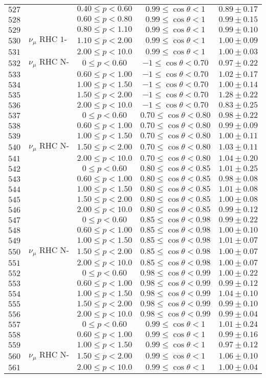 \begin{longtable}[c]{ccccc}
$527$ &  & $0.40\leq p<0.60$ & $0.99\leq\cos\theta<1$ & $0.89\pm0.17$\tabularnewline
$528$ &  & $0.60\leq p<0.80$ & $0.99\leq\cos\theta<1$ & $0.99\pm0.15$\tabularnewline
$529$ &  & $0.80\leq p<1.10$ & $0.99\leq\cos\theta<1$ & $0.99\pm0.10$\tabularnewline
$530$ & $\nu_{\mu}\text{ RHC 1-Trk Air}$ & $1.10\leq p<2.00$ & $0.99\leq\cos\theta<1$ & $1.00\pm0.09$\tabularnewline
$531$ &  & $2.00\leq p<10.0$ & $0.99\leq\cos\theta<1$ & $1.00\pm0.03$\tabularnewline
$532$ & $\nu_{\mu}\text{ RHC N-Trks Air}$ & $0\leq p<0.60$ & $-1\leq\cos\theta<0.70$ & $0.97\pm0.22$\tabularnewline
$533$ &  & $0.60\leq p<1.00$ & $-1\leq\cos\theta<0.70$ & $1.02\pm0.17$\tabularnewline
$534$ &  & $1.00\leq p<1.50$ & $-1\leq\cos\theta<0.70$ & $1.00\pm0.14$\tabularnewline
$535$ &  & $1.50\leq p<2.00$ & $-1\leq\cos\theta<0.70$ & $1.28\pm0.22$\tabularnewline
$536$ &  & $2.00\leq p<10.0$ & $-1\leq\cos\theta<0.70$ & $0.83\pm0.25$\tabularnewline
$537$ &  & $0\leq p<0.60$ & $0.70\leq\cos\theta<0.80$ & $0.98\pm0.22$\tabularnewline
$538$ &  & $0.60\leq p<1.00$ & $0.70\leq\cos\theta<0.80$ & $0.99\pm0.09$\tabularnewline
$539$ &  & $1.00\leq p<1.50$ & $0.70\leq\cos\theta<0.80$ & $1.00\pm0.11$\tabularnewline
$540$ & $\nu_{\mu}\text{ RHC N-Trks Air}$ & $1.50\leq p<2.00$ & $0.70\leq\cos\theta<0.80$ & $1.03\pm0.11$\tabularnewline
$541$ &  & $2.00\leq p<10.0$ & $0.70\leq\cos\theta<0.80$ & $1.04\pm0.20$\tabularnewline
$542$ &  & $0\leq p<0.60$ & $0.80\leq\cos\theta<0.85$ & $1.01\pm0.25$\tabularnewline
$543$ &  & $0.60\leq p<1.00$ & $0.80\leq\cos\theta<0.85$ & $0.98\pm0.08$\tabularnewline
$544$ &  & $1.00\leq p<1.50$ & $0.80\leq\cos\theta<0.85$ & $1.01\pm0.08$\tabularnewline
$545$ &  & $1.50\leq p<2.00$ & $0.80\leq\cos\theta<0.85$ & $1.00\pm0.08$\tabularnewline
$546$ &  & $2.00\leq p<10.0$ & $0.80\leq\cos\theta<0.85$ & $0.99\pm0.12$\tabularnewline
$547$ &  & $0\leq p<0.60$ & $0.85\leq\cos\theta<0.98$ & $0.99\pm0.22$\tabularnewline
$548$ &  & $0.60\leq p<1.00$ & $0.85\leq\cos\theta<0.98$ & $1.00\pm0.10$\tabularnewline
$549$ &  & $1.00\leq p<1.50$ & $0.85\leq\cos\theta<0.98$ & $1.01\pm0.07$\tabularnewline
$550$ & $\nu_{\mu}\text{ RHC N-Trks Air}$ & $1.50\leq p<2.00$ & $0.85\leq\cos\theta<0.98$ & $1.00\pm0.07$\tabularnewline
$551$ &  & $2.00\leq p<10.0$ & $0.85\leq\cos\theta<0.98$ & $1.00\pm0.07$\tabularnewline
$552$ &  & $0\leq p<0.60$ & $0.98\leq\cos\theta<0.99$ & $1.00\pm0.22$\tabularnewline
$553$ &  & $0.60\leq p<1.00$ & $0.98\leq\cos\theta<0.99$ & $0.99\pm0.12$\tabularnewline
$554$ &  & $1.00\leq p<1.50$ & $0.98\leq\cos\theta<0.99$ & $1.04\pm0.10$\tabularnewline
$555$ &  & $1.50\leq p<2.00$ & $0.98\leq\cos\theta<0.99$ & $0.99\pm0.10$\tabularnewline
$556$ &  & $2.00\leq p<10.0$ & $0.98\leq\cos\theta<0.99$ & $0.99\pm0.04$\tabularnewline
$557$ &  & $0\leq p<0.60$ & $0.99\leq\cos\theta<1$ & $1.01\pm0.24$\tabularnewline
$558$ &  & $0.60\leq p<1.00$ & $0.99\leq\cos\theta<1$ & $0.99\pm0.16$\tabularnewline
$559$ &  & $1.00\leq p<1.50$ & $0.99\leq\cos\theta<1$ & $0.97\pm0.12$\tabularnewline
$560$ & $\nu_{\mu}\text{ RHC N-Trks Air}$ & $1.50\leq p<2.00$ & $0.99\leq\cos\theta<1$ & $1.06\pm0.10$\tabularnewline
$561$ &  & $2.00\leq p<10.0$ & $0.99\leq\cos\theta<1$ & $1.00\pm0.04$\tabularnewline
\end{longtable}
